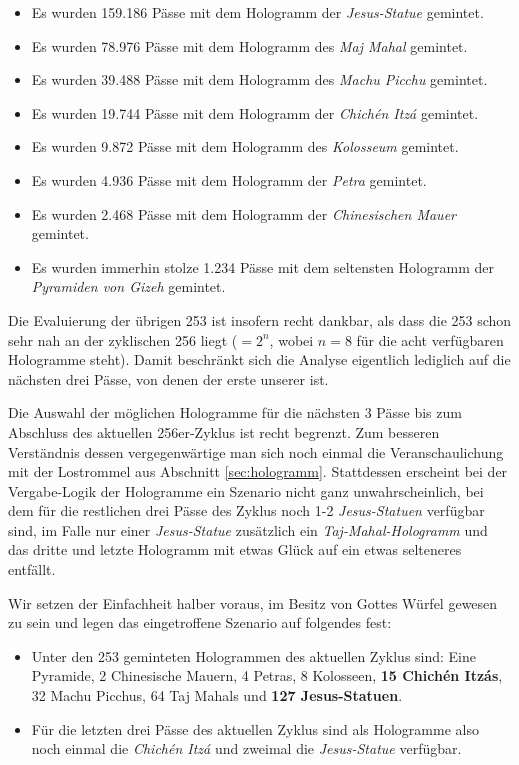 \begin{itemize}
  \item Es wurden 159.186 Pässe mit dem Hologramm der \textit{Jesus-Statue} gemintet.
  \item Es wurden 78.976 Pässe mit dem Hologramm des \textit{Maj Mahal} gemintet.
  \item Es wurden 39.488 Pässe mit dem Hologramm des \textit{Machu Picchu} gemintet.
  \item Es wurden 19.744 Pässe mit dem Hologramm der \textit{Chichén Itzá} gemintet.
  \item Es wurden 9.872 Pässe mit dem Hologramm des \textit{Kolosseum} gemintet.
  \item Es wurden 4.936 Pässe mit dem Hologramm der \textit{Petra} gemintet.
  \item Es wurden 2.468 Pässe mit dem Hologramm der \textit{Chinesischen Mauer} gemintet.
  \item Es wurden immerhin stolze 1.234 Pässe mit dem seltensten Hologramm der \textit{Pyramiden von Gizeh} gemintet.
\end{itemize}

\vspace{0.3cm}

Die Evaluierung der übrigen 253 ist insofern recht dankbar, als dass die 253 schon sehr nah an der zyklischen 256 liegt ($= 2^{n}$, wobei $n=8$ für die acht verfügbaren Hologramme steht). Damit beschränkt sich die Analyse eigentlich lediglich auf die nächsten drei Pässe, von denen der erste unserer ist. 

Die Auswahl der möglichen Hologramme für die nächsten 3 Pässe bis zum Abschluss des aktuellen 256er-Zyklus ist recht begrenzt. Zum besseren Verständnis dessen vergegenwärtige man sich noch einmal die Veranschaulichung mit der Lostrommel aus Abschnitt \ref{sec:hologramm}. Stattdessen erscheint bei der Vergabe-Logik der Hologramme ein Szenario nicht ganz unwahrscheinlich, bei dem für die restlichen drei Pässe des Zyklus noch 1-2 \textit{Jesus-Statuen} verfügbar sind, im Falle nur einer \textit{Jesus-Statue} zusätzlich ein \textit{Taj-Mahal-Hologramm} und das dritte und letzte Hologramm mit etwas Glück auf ein etwas selteneres entfällt.

Wir setzen der Einfachheit halber voraus, im Besitz von Gottes Würfel gewesen zu sein und legen das eingetroffene Szenario auf folgendes fest:

\begin{itemize}
  \item Unter den 253 geminteten Hologrammen des aktuellen Zyklus sind: Eine Pyramide, 2 Chinesische Mauern, 4 Petras, 8 Kolosseen, \textbf{15 Chichén Itzás}, 32 Machu Picchus, 64 Taj Mahals und \textbf{127 Jesus-Statuen}.
  \item Für die letzten drei Pässe des aktuellen Zyklus sind als Hologramme also noch einmal die \textit{Chichén Itzá} und zweimal die \textit{Jesus-Statue} verfügbar.
\end{itemize}

